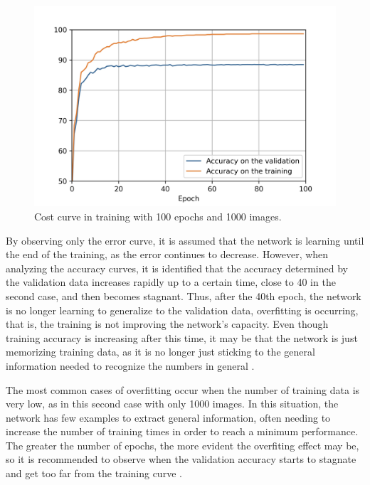 \begin{figure}
    \centering
    \includegraphics[scale=0.6]{"Part 3 - Learning Systems/Supervised Learning/Deep Learning/images/figure116.jpg"}
    \caption{Cost curve in training with 100 epochs and 1000 images.}
    \label{fig:figure116}
\end{figure}

By observing only the error curve, it is assumed that the network is learning until the end of the training, as the error continues to decrease. However, when analyzing the accuracy curves, it is identified that the accuracy determined by the validation data increases rapidly up to a certain time, close to 40 in the second case, and then becomes stagnant. Thus, after the 40th epoch, the network is no longer learning to generalize to the validation data, overfitting is occurring, that is, the training is not improving the network's capacity. Even though training accuracy is increasing after this time, it may be that the network is just memorizing training data, as it is no longer just sticking to the general information needed to recognize the numbers in general \cite{nielsen2015}.

The most common cases of overfitting occur when the number of training data is very low, as in this second case with only 1000 images. In this situation, the network has few examples to extract general information, often needing to increase the number of training times in order to reach a minimum performance. The greater the number of epochs, the more evident the overfiting effect may be, so it is recommended to observe when the validation accuracy starts to stagnate and get too far from the training curve \cite{nielsen2015}.

